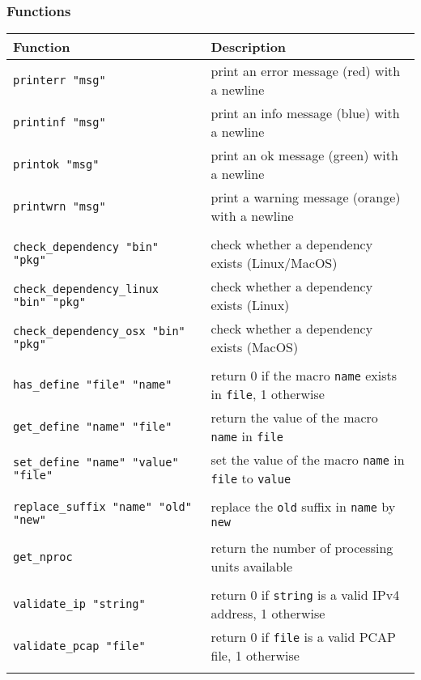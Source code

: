 \documentclass[documentation]{subfiles}
\begin{document}
\subsubsection{Functions}
\begin{longtable}{ll}
    \toprule
    {\bf Function} & {\bf Description}\\
    \midrule\endhead%
    {\tt printerr "msg"} & print an error message (red) with a newline\\
    {\tt printinf "msg"} & print an info message (blue) with a newline\\
    {\tt printok "msg"}  & print an ok message (green) with a newline\\
    {\tt printwrn "msg"} & print a warning message (orange) with a newline\\\\

    {\tt check\_dependency "bin" "pkg"}        & check whether a dependency exists (Linux/MacOS)\\
    {\tt check\_dependency\_linux "bin" "pkg"} & check whether a dependency exists (Linux)\\
    {\tt check\_dependency\_osx "bin" "pkg"}   & check whether a dependency exists (MacOS)\\\\

    {\tt has\_define "file" "name"}            & return 0 if the macro {\tt name} exists in {\tt file}, 1 otherwise\\
    {\tt get\_define "name" "file"}            & return the value of the macro {\tt name} in {\tt file}\\
    {\tt set\_define "name" "value" "file"}    & set the value of the macro {\tt name} in {\tt file} to {\tt value}\\\\

    {\tt replace\_suffix "name" "old" "new"}   & replace the {\tt old} suffix in {\tt name} by {\tt new}\\\\

    {\tt get\_nproc}                           & return the number of processing units available\\\\

    {\tt validate\_ip "string"}                & return 0 if {\tt string} is a valid IPv4 address, 1 otherwise\\
    {\tt validate\_pcap "file"}                & return 0 if {\tt file} is a valid PCAP file, 1 otherwise\\\\


\end{longtable}
\end{document}
